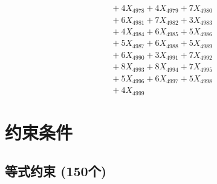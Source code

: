 \documentclass[a4paper,10pt]{article}
\begin{document}
{\begin{align}
&\;  + 4 X_{4978} + 4 X_{4979} + 7 X_{4980} \\[0.3ex]
&\;  + 6 X_{4981} + 7 X_{4982} + 3 X_{4983} \\[0.3ex]
&\;  + 4 X_{4984} + 6 X_{4985} + 5 X_{4986} \\[0.3ex]
&\;  + 5 X_{4987} + 6 X_{4988} + 5 X_{4989} \\[0.5ex]\allowbreak
&\;  + 6 X_{4990} + 3 X_{4991} + 7 X_{4992} \\[0.3ex]
&\;  + 8 X_{4993} + 8 X_{4994} + 7 X_{4995} \\[0.3ex]
&\;  + 5 X_{4996} + 6 X_{4997} + 5 X_{4998} \\[0.3ex]
&\;  + 4 X_{4999}\nonumber
\end{align}
}

\section{约束条件}

\subsection{等式约束 (150个)}
\end{document}

